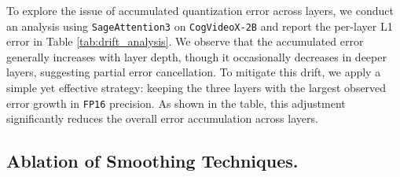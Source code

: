 \begin{table}[H]
\centering
\vspace{-.5em}
\caption{Layer-wise L1 error analysis of \texttt{SageAttention3} on \texttt{CogVideoX-2B}. 
The second row shows the results by retaining the three most sensitive layers in \texttt{FP16}.}
\label{tab:drift_analysis}
\end{table}

To explore the issue of accumulated quantization error across layers, we conduct an analysis using \texttt{SageAttention3} on \texttt{CogVideoX-2B} and report the per-layer L1 error in Table \ref{tab:drift_analysis}. We observe that the accumulated error generally increases with layer depth, though it occasionally decreases in deeper layers, suggesting partial error cancellation.
To mitigate this drift, we apply a simple yet effective strategy: keeping the three layers with the largest observed error growth in \texttt{FP16} precision. As shown in the table, this adjustment significantly reduces the overall error accumulation across layers.

\subsection{Ablation of Smoothing Techniques.}

\begin{table}[H]
\centering
\vspace{-.5em}
\caption{Ablation of attention accuracy with different smoothing methods on \texttt{CogVideoX-2B}. 
Smoothing K and Smoothing Q are techniques from \texttt{SageAttention} and \texttt{SageAttention2}.
}
\label{tab:smooth_ablation}
\end{table}

